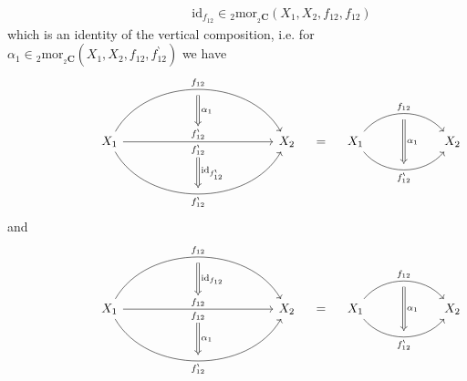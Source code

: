 \begin{enumerate}
\begin{enumerate}
\begin{enumerate}
\begin{align*}
\hspace{7em}
  \mathrm{id}_{f_{12}}
  \in
  {_{2}}\mathrm{mor}_{{_{2}\mathbf{C}}}
  \left(
    X_{1}
    ,
    X_{2}
    ,
    f_{12}
    ,
    f_{12}
  \right)
\end{align*}
which is an identity of the vertical composition, i.e. for $\alpha_{1} \in {_{2}}\mathrm{mor}_{{_{2}\mathbf{C}}}(X_{1},X_{2},f_{12},f_{12}^{\backprime})$ we have
\begin{equation*}
\hspace{7em}
\begin{tikzcd}[row sep=2.4em,column sep=12em]
  X_{1}
  \ar[bend left=60]{r}[swap,name=U]{}{f_{12}}
  \ar{r}[name=M1]{f_{12}^{\backprime}}[swap,name=M2]{f_{12}^{\backprime}}
  \ar[bend right=60]{r}[name=D]{}[swap]{f_{12}^{\backprime}}
  &
  X_{2}
  \ar[Rightarrow,from=U,to=M1,"\alpha_{1}"]
  \ar[Rightarrow,from=M2,to=D,"\mathrm{id}_{f_{12}^{\backprime}}"]
\end{tikzcd}
  \quad
  =
  \quad
\begin{tikzcd}[row sep=2.4em,column sep=5.6em]
  X_{1}
  \ar[bend left=50]{r}[swap,name=U]{}{f_{12}}
  \ar[bend right=50]{r}[name=D]{}[swap]{f_{12}^{\backprime}}
  &
  X_{2}
  \ar[Rightarrow,from=U,to=D,"\alpha_{1}"]
\end{tikzcd}
\end{equation*}
and
\begin{equation*}
\hspace{7em}
\begin{tikzcd}[row sep=2.4em,column sep=12em]
  X_{1}
  \ar[bend left=60]{r}[swap,name=U]{}{f_{12}}
  \ar{r}[name=M1]{f_{12}}[swap,name=M2]{f_{12}}
  \ar[bend right=60]{r}[name=D]{}[swap]{f_{12}^{\backprime}}
  &
  X_{2}
  \ar[Rightarrow,from=U,to=M1,"\mathrm{id}_{f_{12}}"]
  \ar[Rightarrow,from=M2,to=D,"\alpha_{1}"]
\end{tikzcd}
  \quad
  =
  \quad
\begin{tikzcd}[row sep=2.4em,column sep=5.6em]
  X_{1}
  \ar[bend left=50]{r}[swap,name=U]{}{f_{12}}
  \ar[bend right=50]{r}[name=D]{}[swap]{f_{12}^{\backprime}}
  &
  X_{2}
  \ar[Rightarrow,from=U,to=D,"\alpha_{1}"]
\end{tikzcd}
\end{equation*}


\end{enumerate}
\end{enumerate}
\end{enumerate}
